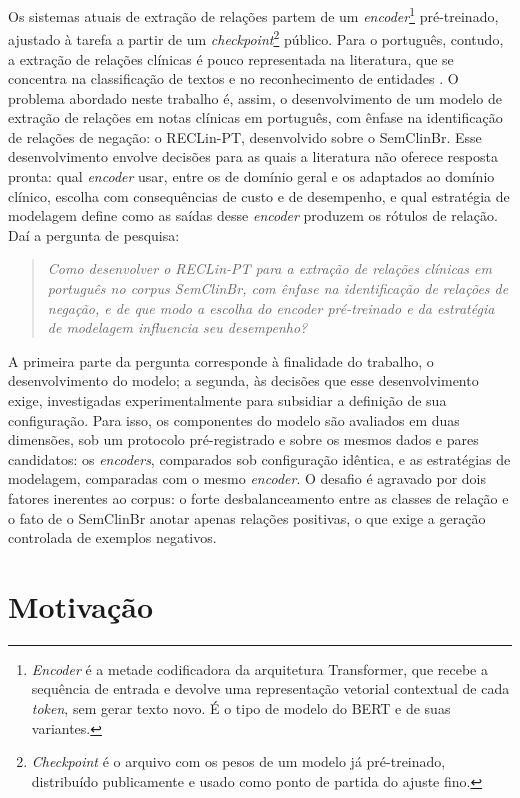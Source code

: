 Os sistemas atuais de extração de relações partem de um \emph{encoder}\footnote{\emph{Encoder} é a
metade codificadora da arquitetura \foreignlanguage{english}{Transformer}, que
recebe a sequência de entrada e devolve uma representação vetorial contextual de
cada \emph{token}, sem gerar texto novo. É o tipo de modelo do BERT e de suas
variantes.} pré-treinado, ajustado à tarefa a partir de um
\emph{checkpoint}\footnote{\emph{Checkpoint} é o arquivo com os pesos de um modelo
já pré-treinado, distribuído publicamente e usado como ponto de partida do ajuste
fino.} público. Para o português, contudo, a extração de relações clínicas é pouco
representada na literatura, que se concentra na classificação de textos e no
reconhecimento de entidades \cite{shimaoka_2026_revisao}. O problema abordado neste
trabalho é, assim, o desenvolvimento de um modelo de extração de relações em notas
clínicas em português, com ênfase na identificação de relações de negação: o
RECLin-PT, desenvolvido sobre o SemClinBr. Esse desenvolvimento envolve decisões para
as quais a literatura não oferece resposta pronta: qual \emph{encoder} usar, entre os
de domínio geral e os adaptados ao domínio clínico, escolha com consequências de
custo e de desempenho, e qual estratégia de modelagem define como as saídas desse
\emph{encoder} produzem os rótulos de relação. Daí a pergunta de pesquisa:

\begin{quote}
\emph{Como desenvolver o RECLin-PT para a extração de relações clínicas em português
no corpus SemClinBr, com ênfase na identificação de relações de negação, e de que
modo a escolha do encoder pré-treinado e da estratégia de modelagem influencia seu
desempenho?}
\end{quote}

A primeira parte da pergunta corresponde à finalidade do trabalho, o desenvolvimento
do modelo; a segunda, às decisões que esse desenvolvimento exige, investigadas
experimentalmente para subsidiar a definição de sua configuração. Para isso, os
componentes do modelo são avaliados em duas dimensões, sob um
protocolo pré-registrado e sobre os mesmos dados e pares candidatos: os
\emph{encoders}, comparados sob configuração idêntica, e as estratégias de
modelagem, comparadas com o mesmo \emph{encoder}. O desafio é agravado por dois
fatores inerentes ao corpus: o forte desbalanceamento entre as classes de relação e o
fato de o SemClinBr anotar apenas relações positivas, o que exige a geração controlada
de exemplos negativos.

\section{Motivação}
\label{sec:motivacao}

